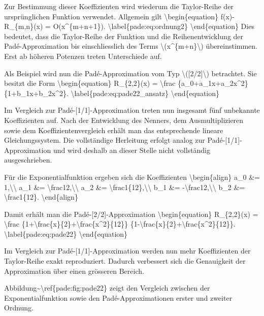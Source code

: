 Zur Bestimmung dieser Koeffizienten wird wiederum die Taylor-Reihe der
ursprünglichen Funktion verwendet. Allgemein gilt
\textbackslash begin\{equation\} f(x)-R\_\{m,n\}(x) = O(x\^{}\{m+n+1\}).
\textbackslash label\{pade:eq:ordnung2\} \textbackslash end\{equation\}
Dies bedeutet, dass die Taylor-Reihe der Funktion und die
Reihenentwicklung der Padé-Approximation bis einschliesslich des Terms
\textbackslash(x\^{}\{m+n\}\textbackslash) übereinstimmen. Erst ab
höheren Potenzen treten Unterschiede auf.

Als Beispiel wird nun die Padé-Approximation vom Typ
\textbackslash({[}2/2{]}\textbackslash) betrachtet. Sie besitzt die Form
\textbackslash begin\{equation\} R\_\{2,2\}(x) = \textbackslash frac
\{a\_0+a\_1x+a\_2x\^{}2\} \{1+b\_1x+b\_2x\^{}2\}.
\textbackslash label\{pade:eq:pade22\_ansatz\}
\textbackslash end\{equation\}

Im Vergleich zur Padé-{[}1/1{]}-Approximation treten nun insgesamt fünf
unbekannte Koeffizienten auf. Nach der Entwicklung des Nenners, dem
Ausmultiplizieren sowie dem Koeffizientenvergleich erhält man das
entsprechende lineare Gleichungssystem. Die vollständige Herleitung
erfolgt analog zur Padé-{[}1/1{]}-Approximation und wird deshalb an
dieser Stelle nicht vollständig ausgeschrieben.

Für die Exponentialfunktion ergeben sich die Koeffizienten
\textbackslash begin\{align\} a\_0 \&= 1,\textbackslash\textbackslash{}
a\_1 \&= \textbackslash frac12,\textbackslash\textbackslash{} a\_2 \&=
\textbackslash frac1\{12\},\textbackslash\textbackslash{} b\_1 \&=
-\textbackslash frac12,\textbackslash\textbackslash{} b\_2 \&=
\textbackslash frac1\{12\}. \textbackslash end\{align\}

Damit erhält man die Padé-{[}2/2{]}-Approximation
\textbackslash begin\{equation\} R\_\{2,2\}(x) = \textbackslash frac
\{1+\textbackslash frac\{x\}\{2\}+\textbackslash frac\{x\^{}2\}\{12\}\}
\{1-\textbackslash frac\{x\}\{2\}+\textbackslash frac\{x\^{}2\}\{12\}\}.
\textbackslash label\{pade:eq:pade22\} \textbackslash end\{equation\}

Im Vergleich zur Padé-{[}1/1{]}-Approximation werden nun mehr
Koeffizienten der Taylor-Reihe exakt reproduziert. Dadurch verbessert
sich die Genauigkeit der Approximation über einen grösseren Bereich.

Abbildung\textasciitilde\textbackslash ref\{pade:fig:pade22\} zeigt den
Vergleich zwischen der Exponentialfunktion sowie den
Padé-Approximationen erster und zweiter Ordnung.

